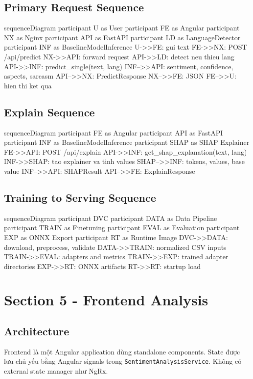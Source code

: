 \subsection{Primary Request Sequence}
\begin{mermaidblock}
sequenceDiagram
  participant U as User
  participant FE as Angular
  participant NX as Nginx
  participant API as FastAPI
  participant LD as LanguageDetector
  participant INF as BaselineModelInference
  U->>FE: gui text
  FE->>NX: POST /api/predict
  NX->>API: forward request
  API->>LD: detect neu thieu lang
  API->>INF: predict_single(text, lang)
  INF-->>API: sentiment, confidence, aspects, sarcasm
  API-->>NX: PredictResponse
  NX-->>FE: JSON
  FE-->>U: hien thi ket qua
\end{mermaidblock}

\subsection{Explain Sequence}
\begin{mermaidblock}
sequenceDiagram
  participant FE as Angular
  participant API as FastAPI
  participant INF as BaselineModelInference
  participant SHAP as SHAP Explainer
  FE->>API: POST /api/explain
  API->>INF: get_shap_explanation(text, lang)
  INF->>SHAP: tao explainer va tinh values
  SHAP-->>INF: tokens, values, base value
  INF-->>API: SHAPResult
  API-->>FE: ExplainResponse
\end{mermaidblock}

\subsection{Training to Serving Sequence}
\begin{mermaidblock}
sequenceDiagram
  participant DVC
  participant DATA as Data Pipeline
  participant TRAIN as Finetuning
  participant EVAL as Evaluation
  participant EXP as ONNX Export
  participant RT as Runtime Image
  DVC->>DATA: download, preprocess, validate
  DATA->>TRAIN: normalized CSV inputs
  TRAIN->>EVAL: adapters and metrics
  TRAIN->>EXP: trained adapter directories
  EXP->>RT: ONNX artifacts
  RT->>RT: startup load
\end{mermaidblock}

\section{Section 5 - Frontend Analysis}
\subsection{Architecture}
Frontend là một Angular application dùng standalone components. State được lưu chủ yếu bằng Angular signals trong \texttt{SentimentAnalysisService}. Không có external state manager như NgRx.

